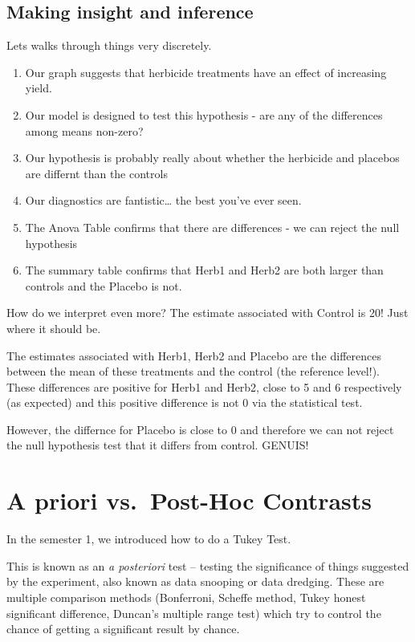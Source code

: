 \documentclass[
]{book}
\providecommand{\tightlist}{%
  \setlength{\itemsep}{0pt}\setlength{\parskip}{0pt}}
\begin{document}
\hypertarget{making-insight-and-inference}{%
\subsection{Making insight and inference}\label{making-insight-and-inference}}

Lets walks through things very discretely.

\begin{enumerate}
\def\labelenumi{\arabic{enumi}.}
\tightlist
\item
  Our graph suggests that herbicide treatments have an effect of increasing yield.
\item
  Our model is designed to test this hypothesis - are any of the differences among means non-zero?
\item
  Our hypothesis is probably really about whether the herbicide and placebos are differnt than the controls
\item
  Our diagnostics are fantistic\ldots{} the best you've ever seen.
\item
  The Anova Table confirms that there are differences - we can reject the null hypothesis
\item
  The summary table confirms that Herb1 and Herb2 are both larger than controls and the Placebo is not.
\end{enumerate}

How do we interpret even more? The estimate associated with Control is 20! Just where it should be.

The estimates associated with Herb1, Herb2 and Placebo are the differences between the mean of these treatments and the control (the reference level!). These differences are positive for Herb1 and Herb2, close to 5 and 6 respectively (as expected) and this positive difference is not 0 via the statistical test.

However, the differnce for Placebo is close to 0 and therefore we can not reject the null hypothesis test that it differs from control. GENUIS!

\hypertarget{a-priori-vs.-post-hoc-contrasts}{%
\section{A priori vs.~Post-Hoc Contrasts}\label{a-priori-vs.-post-hoc-contrasts}}

In the semester 1, we introduced how to do a Tukey Test.

This is known as an \emph{a posteriori} test -- testing the significance of things suggested by the experiment, also known as data snooping or data dredging. These are multiple comparison methods (Bonferroni, Scheffe method, Tukey honest significant difference, Duncan's multiple range test) which try to control the chance of getting a significant result by chance.
\end{document}
